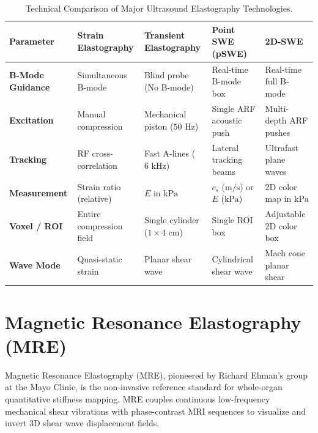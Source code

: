 \documentclass[11pt,a4paper]{article}
\begin{document}
\begin{table}[htbp]
\centering
\small
\setlength{\tabcolsep}{2.5pt}
\caption{Technical Comparison of Major Ultrasound Elastography Technologies.}
\label{tab:use_comparison}
\begin{tabular}{p{2.6cm} p{3.2cm} p{3.0cm} p{3.0cm} p{3.2cm}}
\toprule
\textbf{Parameter} & \textbf{Strain Elastography} & \textbf{Transient Elastography} & \textbf{Point SWE (pSWE)} & \textbf{2D-SWE} \\
\midrule
\textbf{B-Mode Guidance} & Simultaneous B-mode & Blind probe (No B-mode) & Real-time B-mode box & Real-time full B-mode \\
\addlinespace
\textbf{Excitation} & Manual compression & Mechanical piston ($50\text{ Hz}$) & Single ARF acoustic push & Multi-depth ARF pushes \\
\addlinespace
\textbf{Tracking} & RF cross-correlation & Fast A-lines ($6\text{ kHz}$) & Lateral tracking beams & Ultrafast plane waves \\
\addlinespace
\textbf{Measurement} & Strain ratio (relative) & $E$ in $\text{kPa}$ & $c_s$ ($\text{m/s}$) or $E$ ($\text{kPa}$) & 2D color map in $\text{kPa}$ \\
\addlinespace
\textbf{Voxel / ROI} & Entire compression field & Single cylinder ($1 \times 4\text{ cm}$) & Single ROI box & Adjustable 2D color box \\
\addlinespace
\textbf{Wave Mode} & Quasi-static strain & Planar shear wave & Cylindrical shear wave & Mach cone planar shear \\
\bottomrule
\end{tabular}
\end{table}

\section{Magnetic Resonance Elastography (MRE)}
Magnetic Resonance Elastography (MRE), pioneered by Richard Ehman's group at the Mayo Clinic, is the non-invasive reference standard for whole-organ quantitative stiffness mapping. MRE couples continuous low-frequency mechanical shear vibrations with phase-contrast MRI sequences to visualize and invert 3D shear wave displacement fields.
\end{document}
